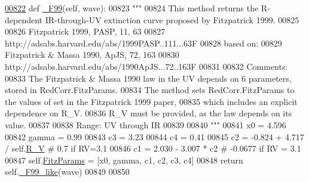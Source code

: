 \begin{DoxyVerb}
\begin{DoxyCode}
\hypertarget{classpyneb_1_1extinction_1_1red__corr_1_1_red_corr_l00822}{}\hyperlink{classpyneb_1_1extinction_1_1red__corr_1_1_red_corr_a05f6dd65005f473d38e0c1014c58fb61}{00822}     \textcolor{keyword}{def }\hyperlink{classpyneb_1_1extinction_1_1red__corr_1_1_red_corr_a05f6dd65005f473d38e0c1014c58fb61}{\_F99}(self, wave):
00823         \textcolor{stringliteral}{"""}
00824 \textcolor{stringliteral}{        This method returns the R-dependent IR-through-UV extinction curve proposed by Fitzpatrick 1999.}
00825 \textcolor{stringliteral}{}
00826 \textcolor{stringliteral}{        Fitzpatrick 1999, PASP, 11, 63}
00827 \textcolor{stringliteral}{        http://adsabs.harvard.edu/abs/1999PASP..111...63F}
00828 \textcolor{stringliteral}{        based on: }
00829 \textcolor{stringliteral}{        Fitzpatrick & Massa 1990, ApJS, 72, 163}
00830 \textcolor{stringliteral}{        http://adsabs.harvard.edu/abs/1990ApJS...72..163F}
00831 \textcolor{stringliteral}{        }
00832 \textcolor{stringliteral}{        Comments:}
00833 \textcolor{stringliteral}{        The Fitzpatrick & Massa 1990 law in the UV depends on 6 parameters, stored in RedCorr.FitzParams.}
00834 \textcolor{stringliteral}{        The method sets RedCorr.FitzParams to the values of set in the Fitzpatrick 1999 paper, }
00835 \textcolor{stringliteral}{        which includes an explicit dependence on R\_V.}
00836 \textcolor{stringliteral}{        R\_V must be provided, as the law depends on its value.}
00837 \textcolor{stringliteral}{        }
00838 \textcolor{stringliteral}{        Range: UV through IR}
00839 \textcolor{stringliteral}{}
00840 \textcolor{stringliteral}{        """}
00841         x0 = 4.596  
00842         gamma = 0.99    
00843         c3 = 3.23    
00844         c4 = 0.41    
00845         c2 = -0.824 + 4.717 / self.\hyperlink{classpyneb_1_1extinction_1_1red__corr_1_1_red_corr_a4696ecdd84c912c20e6aa19b1573e875}{R\_V} \textcolor{comment}{# 0.7 if RV=3.1}
00846         c1 = 2.030 - 3.007 * c2 \textcolor{comment}{# -0.0677 if RV = 3.1}
00847         self.\hyperlink{classpyneb_1_1extinction_1_1red__corr_1_1_red_corr_a133fcc7513d358e629266b24cbe7bebc}{FitzParams} = [x0, gamma, c1, c2, c3, c4]
00848         \textcolor{keywordflow}{return} self.\hyperlink{classpyneb_1_1extinction_1_1red__corr_1_1_red_corr_afa769aa42ed7d39fb04fd36fda88b54e}{\_F99\_like}(wave)
00849 
00850 
\end{DoxyCode}
\hypertarget{classpyneb_1_1extinction_1_1red__corr_1_1_red_corr_afa769aa42ed7d39fb04fd36fda88b54e}{}

\end{DoxyVerb}

